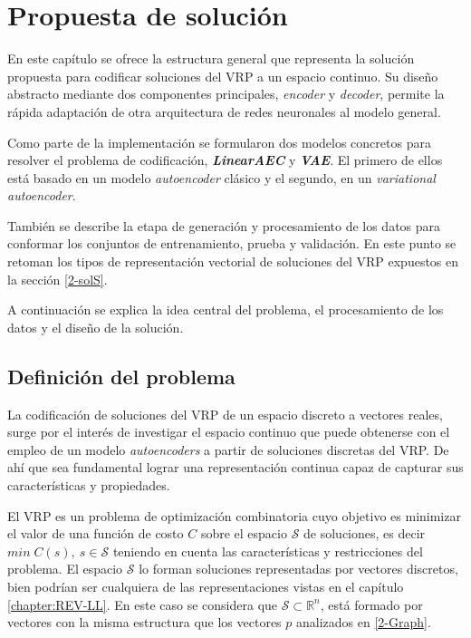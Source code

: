 \chapter{Propuesta de solución}\label{chapter:Solution}

En este capítulo se ofrece la estructura general que representa la solución propuesta para codificar soluciones del VRP a un espacio continuo. Su diseño abstracto mediante dos componentes principales, \textit{encoder} y \textit{decoder}, permite la rápida adaptación de otra arquitectura de redes neuronales al modelo general. 

Como parte de la implementación se formularon dos modelos concretos para resolver el problema de codificación, \textit{\textbf{LinearAEC}} y \textit{\textbf{VAE}}. El primero de ellos está basado en un modelo \textit{autoencoder} clásico y el segundo, en un \textit{variational autoencoder}.

También se describe la etapa de generación y procesamiento de los datos para conformar los conjuntos de entrenamiento, prueba y validación. En este punto se retoman los tipos de representación vectorial de soluciones del VRP expuestos en la sección \ref{2-solS}.

A continuación se explica la idea central del problema, el procesamiento de los datos y el diseño de la solución. 


\section{Definición del problema}

La codificación de soluciones del VRP de un espacio discreto a vectores reales, surge por el interés de investigar el espacio continuo que puede obtenerse con el empleo de un modelo \textit{autoencoders} a partir de soluciones discretas del VRP.
De ahí que sea fundamental lograr una representación continua capaz de capturar sus características y propiedades.

El VRP es un problema de optimización combinatoria cuyo objetivo es minimizar el
 valor de una función de costo $C$ sobre el espacio $\mathcal{S}$ de soluciones, es decir $min \; C(s), \: s\in \mathcal{S}$ teniendo en cuenta las características y restricciones del problema. El espacio $\mathcal{S}$ lo forman soluciones representadas por vectores discretos, bien podrían ser cualquiera de las representaciones vistas en el capítulo \ref{chapter:REV-LL}. En este caso se considera que $\mathcal{S} \subset \mathbb{R}^{n}$, está formado por vectores con la misma estructura que los vectores $p$ analizados en \ref{2-Graph}.
 
